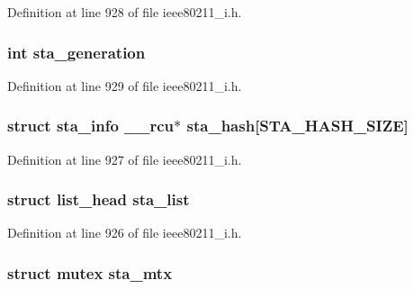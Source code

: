 Definition at line 928 of file ieee80211\-\_\-i.\-h.

\hypertarget{structieee80211__local_a97ee12a47f59b1e2ffa51cca68a70304}{
\subsubsection[{sta\-\_\-generation}]{\setlength{\rightskip}{0pt plus 5cm}int sta\-\_\-generation}}\label{structieee80211__local_a97ee12a47f59b1e2ffa51cca68a70304}


Definition at line 929 of file ieee80211\-\_\-i.\-h.

\hypertarget{structieee80211__local_a6014b1885979a210472e849167192cec}{
\subsubsection[{sta\-\_\-hash}]{\setlength{\rightskip}{0pt plus 5cm}struct {\bf sta\-\_\-info} \-\_\-\-\_\-rcu$\ast$ sta\-\_\-hash\mbox{[}{\bf S\-T\-A\-\_\-\-H\-A\-S\-H\-\_\-\-S\-I\-Z\-E}\mbox{]}}}\label{structieee80211__local_a6014b1885979a210472e849167192cec}


Definition at line 927 of file ieee80211\-\_\-i.\-h.

\hypertarget{structieee80211__local_aa442db3b90ab8934df91ba31e7602e66}{
\subsubsection[{sta\-\_\-list}]{\setlength{\rightskip}{0pt plus 5cm}struct list\-\_\-head sta\-\_\-list}}\label{structieee80211__local_aa442db3b90ab8934df91ba31e7602e66}


Definition at line 926 of file ieee80211\-\_\-i.\-h.

\hypertarget{structieee80211__local_a8fb5b2a5fbdd771e5d8cbd9e6f3f0652}{
\subsubsection[{sta\-\_\-mtx}]{\setlength{\rightskip}{0pt plus 5cm}struct mutex sta\-\_\-mtx}}\label{structieee80211__local_a8fb5b2a5fbdd771e5d8cbd9e6f3f0652}


